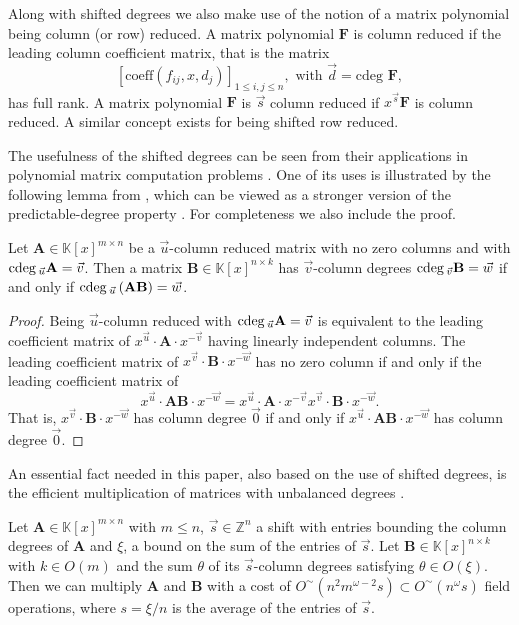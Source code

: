 Along with shifted degrees we also make use of the notion of a matrix
polynomial being column (or row) reduced. A matrix polynomial $\mathbf{F}$
is column reduced if the leading column coefficient matrix, that is
the matrix 
\[
[\mbox{coeff}(f_{ij},x,d_{j})]_{1\leq i,j\leq n},\mbox{ with }\vec{d}=\mbox{cdeg }\mathbf{F},
\]
 has full rank. A matrix polynomial $\mathbf{F}$ is $\vec{s}$ column
reduced if $x^{\vec{s}}\mathbf{F}$ is column reduced. A similar concept
exists for being shifted row reduced.

The usefulness of the shifted degrees can be seen from their applications
in polynomial matrix computation problems \citet{ZL2012,za2012}.
One of its uses is illustrated by the following lemma from \citet[Chapter 2]{zhou:phd2012},
which can be viewed as a stronger version of the predictable-degree
property \citet[page 387]{kailath:1980}. For completeness we also
include the proof. 
\begin{lem}
\label{lem:predictableDegree} Let $\mathbf{A}\in\mathbb{K}\left[x\right]^{m\times n}$
be a $\vec{u}$-column reduced matrix with no zero columns and with
${\rm cdeg}\,_{\vec{u}}\mathbf{A}=\vec{v}$. Then a matrix $\mathbf{B}\in\mathbb{K}\left[x\right]^{n\times k}$
has $\vec{v}$-column degrees ${\rm cdeg}\,_{\vec{v}}\mathbf{B}=\vec{w}$
if and only if ${\rm cdeg}\,_{\vec{u}}\left(\mathbf{A}\mathbf{B}\right)=\vec{w}$. \end{lem}
\begin{proof}
Being $\vec{u}$-column reduced with ${\rm cdeg}\,_{\vec{u}}\mathbf{A}=\vec{v}$
is equivalent to the leading coefficient matrix of $x^{\vec{u}}\cdot\mathbf{A}\cdot x^{-\vec{v}}$
having linearly independent columns. The leading coefficient matrix
of $x^{\vec{v}}\cdot\mathbf{B}\cdot x^{-\vec{w}}$ has no zero column
if and only if the leading coefficient matrix of 
\[
x^{\vec{u}}\cdot\mathbf{AB}\cdot x^{-\vec{w}}=x^{\vec{u}}\cdot\mathbf{A}\cdot x^{-\vec{v}}x^{\vec{v}}\cdot\mathbf{B}\cdot x^{-\vec{w}}.
\]
 That is, $x^{\vec{v}}\cdot\mathbf{B}\cdot x^{-\vec{w}}$ has column
degree $\vec{0}$ if and only if $x^{\vec{u}}\cdot\mathbf{AB}\cdot x^{-\vec{w}}$
has column degree $\vec{0}$. 
\end{proof}
An essential fact needed in this paper, also based on the use of shifted
degrees, is the efficient multiplication of matrices with unbalanced
degrees \citet[Theorem 3.7]{za2012}. 
\begin{thm}
\label{thm:multiplyUnbalancedMatrices} Let $\mathbf{A}\in\mathbb{K}\left[x\right]^{m\times n}$
with $m\le n$, $\vec{s}\in\mathbb{Z}^{n}$ a shift with entries bounding
the column degrees of $\mathbf{A}$ and $\xi$, a bound on the sum
of the entries of $\vec{s}$. Let $\mathbf{B}\in\mathbb{K}\left[x\right]^{n\times k}$
with $k\in O\left(m\right)$ and the sum $\theta$ of its $\vec{s}$-column
degrees satisfying $\theta\in O\left(\xi\right)$. Then we can multiply
$\mathbf{A}$ and $\mathbf{B}$ with a cost of $O^{\sim}(n^{2}m^{\omega-2}s)\subset O^{\sim}(n^{\omega}s)$
field operations, where $s=\xi/n$ is the average of the entries of
$\vec{s}$. 
\end{thm}

